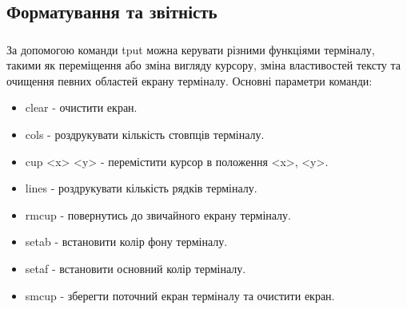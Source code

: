 \documentclass[t]{beamer}  %
\begin{document}
\subsection{Форматування та звітність}

\begin{frame}
 	\frametitle{\insertsection} 
 	\framesubtitle{\insertsubsection}
За допомогою команди tput можна керувати різними функціями терміналу, такими як переміщення або зміна вигляду курсору, зміна властивостей тексту та очищення певних областей екрану терміналу. Основні параметри команди:
\begin{itemize}
	\item clear - очистити екран.
	\item cols - роздрукувати кількість стовпців терміналу.
	\item cup <x> <y> - перемістити курсор в положення <x>, <y>.
	\item lines - роздрукувати кількість рядків терміналу.
	\item rmcup - повернутись до звичайного екрану терміналу.
	\item setab - встановити колір фону терміналу.
	\item setaf - встановити основний колір терміналу.
	\item smcup - зберегти поточний екран терміналу та очистити екран.
\end{itemize}	
\end{frame}
\end{document}
